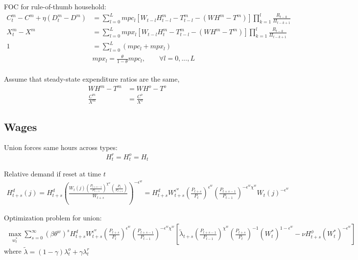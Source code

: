 \documentclass[11pt]{article}
\begin{document}
FOC for rule-of-thumb household:
\begin{align*}
	C_t^m - C^m + \eta (D_t^m - D^m)  &= \sum_{l=0}^{L} mpc_l [ W_{t-l} H_{t-l}^m - T_{t-l}^m - (W H^m - T^m )]\prod_{k=1}^{l}\frac{R_{t-k}}{\Pi_{t-k+1}} \\
	X_t^m - X^m &= \sum_{l=0}^{L} mpx_l [ W_{t-l} H_t^m - T_{t-l}^m - (W H^m - T^m )]\prod_{k=1}^{l}\frac{R_{t-k}}{\Pi_{t-k+1}} \\
	1&= \sum_{l=0}^{L} \left(mpc_l + mpx_l\right) \\
	& mpx_l = \frac{\theta}{1-\theta} mpc_l,	\qquad \forall l=0,...,L  \\
\end{align*} 

Assume that steady-state expenditure ratios are the same,
\begin{align*}
	W H^m - T^m &= W H^o - T^o \\
	\frac{C^m}{X^m} &= \frac{C^o}{X^o}
\end{align*}


\subsection{Wages}

Union forces same hours across types:
\begin{align*}
	H_t^r = H_t^o = H_t
\end{align*}

Relative demand if reset at time $t$
\begin{align*}
	H_{t+s}^d(j) = H_{t+s}^d \left(\frac{W_{t}(j)(\frac{P_{t+s-1}}{P_{t-1}})^{\chi^w} (\frac{P_t}{P_{t+s}})}{W_{t+s}}\right)^{-\epsilon^w} = H_{t+s}^d W_{t+s}^{\epsilon^w} \left(\frac{P_{t+s}}{P_{t}}\right)^{\epsilon^w} \left(\frac{P_{t+s-1}}{P_{t-1}}\right)^{-\epsilon^w\chi^w}  W_{t}(j)^{-\epsilon^w}
\end{align*}

Optimization problem for union:
\begin{align*}
	\max_{w_t^*} \sum_{s=0}^{\infty} (\beta\theta^w)^{s}H_{t+s}^d W_{t+s}^{\epsilon^w} \left(\frac{P_{t+s}}{P_{t}}\right)^{\epsilon^w}\left(\frac{P_{t+s-1}}{P_{t-1}}\right)^{-\epsilon^w\chi^w}\left[\tilde{\lambda}_{t+s}\left(\frac{P_{t+s-1}}{P_{t-1}}\right)^{\chi^w}\left(\frac{P_{t+s}}{P_{t}}\right)^{-1}(W_t^*)^{1-\epsilon^w}   - \nu H_{t+s}^{\phi} (W_t^*)^{-\epsilon^w}\right]
\end{align*}
where $\tilde{\lambda} = (1-\gamma)\lambda_t^o + \gamma\lambda_t^r$
\end{document}
